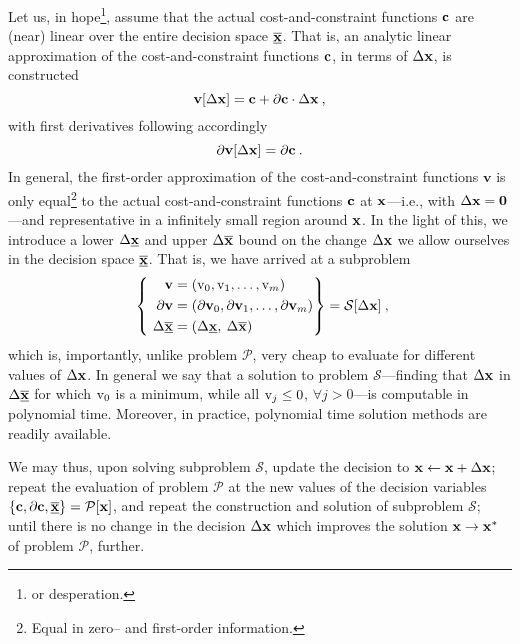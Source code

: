 \documentclass[11pt]{article}
\begin{document}
Let us, in hope\footnote{or desperation.}, assume that the actual cost-and-constraint functions $\mathbf{c}$ are (near) linear over the entire decision space $\underline{\overline{\mathbf{x}}}$. That is, an analytic linear approximation of the cost-and-constraint functions $\mathbf{c}$, in terms of $\Delta \mathbf{x}$, is constructed
\begin{equation}
\textbf{v}[\Delta \mathbf{x}] = \mathbf{c} + \partial \mathbf{c} \cdot  \Delta \mathbf{x}   \:,
\end{equation}
with first derivatives following accordingly
\begin{equation}
\partial \textbf{v}[\Delta \mathbf{x}] = \partial \mathbf{c} \:.
\end{equation}
In general, the first-order approximation of the cost-and-constraint functions $\textbf{v}$ is only equal\footnote{Equal in zero-- and first-order information.} to the actual cost-and-constraint functions $\mathbf{c}$ at $\mathbf{x}$---i.e., with $\Delta \mathbf{x}=\textbf{0}$---and representative in a infinitely small region around $\mathbf{x}$. In the light of this, we introduce a lower $\Delta \underline{\mathbf{x}}$ and upper $\Delta \overline{\mathbf{x}}$ bound on the change $\Delta \mathbf{x}$ we allow ourselves in the decision space $\underline{\overline{\mathbf{x}}}$.
That is, we have arrived at a subproblem 
\begin{align}
\label{d:eqn:p}
 ~\left\{ ~
\begin{aligned}
\mathbf{v} &= (\textrm{v}_0, \textrm{v}_1, \ldots, \textrm{v}_m ) \\
\mathbf{\partial v} & = (\mathbf{\partial v}_0 , \mathbf{\partial v}_1 , \ldots,\mathbf{\partial v}_m  ) \\
\Delta \underline{\overline{\mathbf{x}}} & = ( \Delta \underline{\mathbf{x}} , \: \Delta \overline{\mathbf{x}} ) \:
\end{aligned}\right\} =
\mathcal{S} [\Delta \mathbf{x}] \: ,
\end{align}
which is, importantly, unlike problem $\mathcal{P}$, very cheap to evaluate for different values of $\Delta \mathbf{x}$. In general we say that a solution to problem $\mathcal{S}$---finding that $\Delta \mathbf{x}$ in $\Delta \overline{\underline{\mathbf{x}}}$ for which $\textrm{v}_0$ is a minimum, while all $\textrm{v}_j \leq 0$, $\forall j > 0$---is computable in polynomial time. Moreover, in practice, polynomial time solution methods are readily available.

We may thus, upon solving subproblem $\mathcal{S}$, update the decision to $\mathbf{x} \gets \mathbf{x} + \Delta \mathbf{x}$; repeat the evaluation of problem $\mathcal{P}$ at the new values of the decision variables $\left\{\mathbf{c}, \partial \mathbf{c}, \underline{\overline{\mathbf{x}}}\right\}=\mathcal{P}[\mathbf{x}]$, and repeat the construction and solution of subproblem $\mathcal{S}$; until there is no change in the decision $\Delta \mathbf{x}$ which improves the solution $\mathbf{x} \to \mathbf{x}^\ast$ of problem $\mathcal{P}$, further. 
\end{document}
